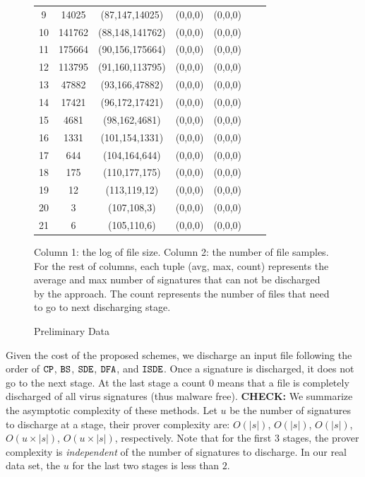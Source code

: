 \begin{figure}
\begin{footnotesize}
\begin{center}
\begin{tabular}{c c c c c c c}
\hline
9 &   14025  & (87,147,14025)  & (0,0,0) & (0,0,0) \\
10 &   141762     & (88,148,141762) & (0,0,0) & (0,0,0) \\
11 &  175664     & (90,156,175664) & (0,0,0) & (0,0,0) \\
12 &  113795     & (91,160,113795) & (0,0,0) & (0,0,0) \\
13 &  47882  & (93,166,47882)  & (0,0,0) & (0,0,0) \\
14 &  17421  & (96,172,17421)  & (0,0,0) & (0,0,0) \\
15 &  4681   & (98,162,4681)   & (0,0,0) & (0,0,0) \\
16 &  1331   & (101,154,1331)  & (0,0,0) & (0,0,0) \\
17 &  644    & (104,164,644)   & (0,0,0) & (0,0,0) \\
18 &  175    & (110,177,175)   & (0,0,0) & (0,0,0) \\
19 &  12     & (113,119,12)    & (0,0,0) & (0,0,0) \\
20 &  3  & (107,108,3) & (0,0,0) & (0,0,0) \\
21 &  6  & (105,110,6) & (0,0,0) & (0,0,0) \\
\end{tabular}
\end{center}
\end{footnotesize}
\caption{Preliminary Data}
\footnotesize{Column 1: the log of file size. Column 2: the number of file samples.
For the rest of columns, each tuple (avg, max, count) represents the average and max
number of signatures that can not be discharged by the approach. The count represents
the number of files that need to go to next discharging stage.}
\label{fig:predata}
\end{figure}

Given the cost of the proposed schemes, we discharge an input file following
the order of $\texttt{CP}$, $\texttt{BS}$, $\texttt{SDE}$, $\texttt{DFA}$, and $\texttt{ISDE}$. Once a signature
is discharged, it does not go to the next stage. At the last stage
a count $0$ means that a file is completely discharged of all virus signatures
(thus malware free).  {\bf CHECK:} We summarize the asymptotic complexity of
these methods.  Let $u$ be the number of signatures to discharge
at a stage, their prover complexity are:
$O(|s|)$, $O(|s|)$,  $O(|s|)$, $O(u \times |s|)$, $O(u \times |s|)$, respectively.
Note that for the first $3$ stages, the prover complexity is
{\em independent} of the number of signatures to discharge.
In our real data set, the $u$ for the last two stages is less than $2$.


